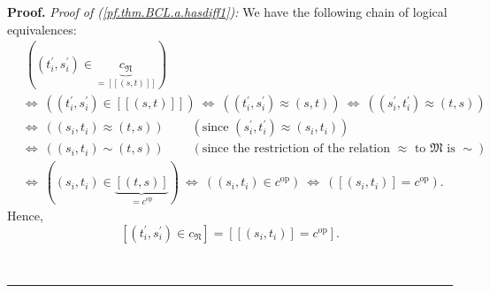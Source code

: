 \documentclass[numbers=enddot,12pt,final,onecolumn,notitlepage,abstracton]{scrartcl}%
\theoremstyle{definition}
\newenvironment{proof}[1][Proof]{\noindent\textbf{#1.} }{\ \rule{0.5em}{0.5em}}
\begin{document}
\begin{proof}
\textit{Proof of (\ref{pf.thm.BCL.a.hasdiff1}):} We have the following chain
of logical equivalences:%
\begin{align*}
&  \ \left(  \left(  t_{i}^{\prime},s_{i}^{\prime}\right)  \in
\underbrace{c_{\mathfrak{N}}}_{=\left[  \left[  \left(  s,t\right)  \right]
\right]  }\right) \\
&  \Longleftrightarrow\ \left(  \left(  t_{i}^{\prime},s_{i}^{\prime}\right)
\in\left[  \left[  \left(  s,t\right)  \right]  \right]  \right)
\ \Longleftrightarrow\ \left(  \left(  t_{i}^{\prime},s_{i}^{\prime}\right)
\approx\left(  s,t\right)  \right)  \ \Longleftrightarrow\ \left(  \left(
s_{i}^{\prime},t_{i}^{\prime}\right)  \approx\left(  t,s\right)  \right) \\
&  \Longleftrightarrow\ \left(  \left(  s_{i},t_{i}\right)  \approx\left(
t,s\right)  \right)  \ \ \ \ \ \ \ \ \ \ \left(  \text{since }\left(
s_{i}^{\prime},t_{i}^{\prime}\right)  \approx\left(  s_{i},t_{i}\right)
\right) \\
&  \Longleftrightarrow\ \left(  \left(  s_{i},t_{i}\right)  \sim\left(
t,s\right)  \right)  \ \ \ \ \ \ \ \ \ \ \left(  \text{since the restriction
of the relation }\approx\text{ to }\mathfrak{M}\text{ is }\sim\right) \\
&  \Longleftrightarrow\ \left(  \left(  s_{i},t_{i}\right)  \in
\underbrace{\left[  \left(  t,s\right)  \right]  }_{=c^{\operatorname*{op}}%
}\right)  \ \Longleftrightarrow\ \left(  \left(  s_{i},t_{i}\right)  \in
c^{\operatorname*{op}}\right)  \ \Longleftrightarrow\ \left(  \left[  \left(
s_{i},t_{i}\right)  \right]  =c^{\operatorname*{op}}\right)  .
\end{align*}
Hence,%
\begin{equation}
\left[  \left(  t_{i}^{\prime},s_{i}^{\prime}\right)  \in c_{\mathfrak{N}%
}\right]  =\left[  \left[  \left(  s_{i},t_{i}\right)  \right]
=c^{\operatorname*{op}}\right]  . \label{pf.thm.BCL.a.hasdiff1.eq1}%
\end{equation}



\end{proof}
\end{document}
